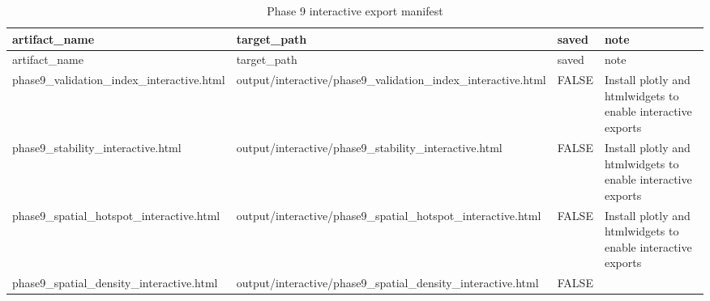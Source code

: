 \documentclass[
]{article}
\begin{document}
\begin{longtable}[]{@{}
  >{\raggedright\arraybackslash}p{}
  >{\raggedright\arraybackslash}p{}
  >{\raggedright\arraybackslash}p{}
  >{\raggedright\arraybackslash}p{}@{}}
\caption{Phase 9 interactive export manifest}\tabularnewline
\toprule\noalign{}
\begin{minipage}[b]{\linewidth}\raggedright
artifact\_name
\end{minipage} & \begin{minipage}[b]{\linewidth}\raggedright
target\_path
\end{minipage} & \begin{minipage}[b]{\linewidth}\raggedright
saved
\end{minipage} & \begin{minipage}[b]{\linewidth}\raggedright
note
\end{minipage} \\
\midrule\noalign{}
\endfirsthead
\toprule\noalign{}
\begin{minipage}[b]{\linewidth}\raggedright
artifact\_name
\end{minipage} & \begin{minipage}[b]{\linewidth}\raggedright
target\_path
\end{minipage} & \begin{minipage}[b]{\linewidth}\raggedright
saved
\end{minipage} & \begin{minipage}[b]{\linewidth}\raggedright
note
\end{minipage} \\
\midrule\noalign{}
\endhead
\bottomrule\noalign{}
\endlastfoot
phase9\_validation\_index\_interactive.html &
output/interactive/phase9\_validation\_index\_interactive.html & FALSE &
Install plotly and htmlwidgets to enable interactive exports \\
phase9\_stability\_interactive.html &
output/interactive/phase9\_stability\_interactive.html & FALSE & Install
plotly and htmlwidgets to enable interactive exports \\
phase9\_spatial\_hotspot\_interactive.html &
output/interactive/phase9\_spatial\_hotspot\_interactive.html & FALSE &
Install plotly and htmlwidgets to enable interactive exports \\
phase9\_spatial\_density\_interactive.html &
output/interactive/phase9\_spatial\_density\_interactive.html & FALSE &

\end{longtable}
\end{document}
